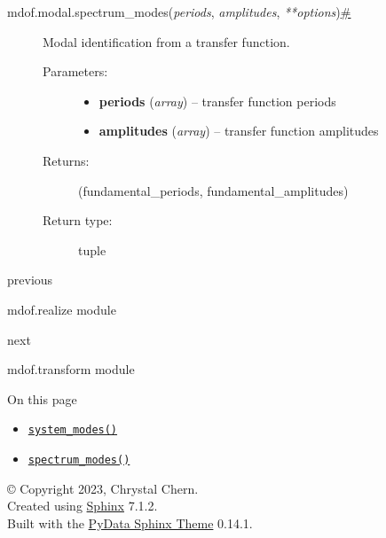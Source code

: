 \begin{description}
\item[{ {{mdof.modal.}}{{spectrum\_modes}}{(}\emph{{{periods}}},
\emph{{{amplitudes}}},
\emph{{{**}}{{options}}}{)}\protect\hyperlink{mdof.modal.spectrum_modes}{\#}}]
Modal identification from a transfer function.

\begin{description}
\item[Parameters{:}]
\begin{itemize}
\item
  \textbf{periods} (\emph{array}) -- transfer function periods
\item
  \textbf{amplitudes} (\emph{array}) -- transfer function amplitudes
\end{itemize}
\item[Returns{:}]
(fundamental\_periods, fundamental\_amplitudes)
\item[Return type{:}]
tuple
\end{description}
\end{description}

\href{mdof.realize.html}{\emph{}}

previous

mdof.realize module

\href{mdof.transform.html}{}

next

mdof.transform module

\emph{}

\emph{} On this page

\begin{itemize}
\tightlist
\item
  \protect\hyperlink{mdof.modal.system_modes}{\texttt{system\_modes()}}
\item
  \protect\hyperlink{mdof.modal.spectrum_modes}{\texttt{spectrum\_modes()}}
\end{itemize}

© Copyright 2023, Chrystal Chern.\\

Created using \href{https://www.sphinx-doc.org/}{Sphinx} 7.1.2.\\

Built with the
\href{https://pydata-sphinx-theme.readthedocs.io/en/stable/index.html}{PyData
Sphinx Theme} 0.14.1.
